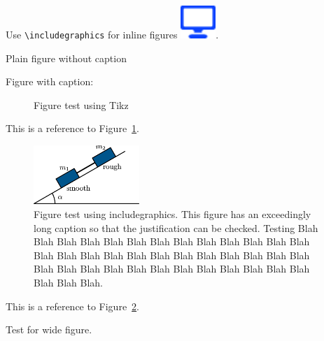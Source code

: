 \documentclass[solutionsatend,twocolumnsolutions]{ouunit}
\begin{document}
Use \verb"\includegraphics" for inline figures \includegraphics[height=2ex]{icon}.


Plain figure without caption

\begin{figure}
\end{figure}

Figure with caption:
\begin{figure}
\caption{Figure test using Tikz}
\label{fig-test-tikz}
\end{figure}

This is a reference to Figure~\ref{fig-test-tikz}.

\begin{figure}
\caption{Figure test using includegraphics\label{fig-test-includegraphics}. This figure has an exceedingly long caption so that the justification can be checked. Testing Blah Blah Blah Blah Blah Blah Blah Blah Blah Blah Blah Blah Blah Blah Blah Blah Blah Blah Blah Blah Blah Blah Blah Blah Blah Blah Blah Blah Blah Blah Blah Blah Blah Blah Blah Blah Blah Blah Blah Blah.}
\includegraphics[width=4cm]{test}
\end{figure}
This is a reference to Figure~\ref{fig-test-includegraphics}.

Test for wide figure.

\lipsum[134]

\begin{widefigure}
\caption{Widefigure test\label{fig-test-widefigure-one}}
\end{widefigure}
\end{document}
